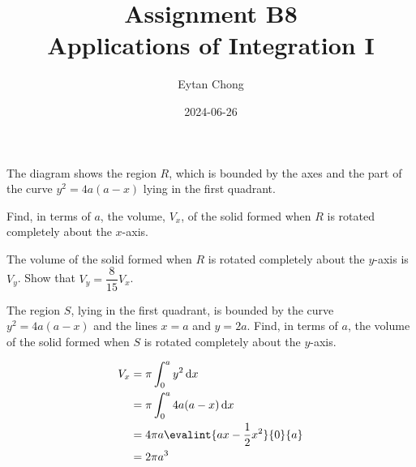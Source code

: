 \documentclass{echw}
\title{Assignment B8\\Applications of Integration I}
\author{Eytan Chong}
\date{2024-06-26}
\begin{document}
    \problem{}
        The diagram shows the region $R$, which is bounded by the axes and the part of the curve $y^2 = 4a(a-x)$ lying in the first quadrant.

        Find, in terms of $a$, the volume, $V_x$, of the solid formed when $R$ is rotated completely about the $x$-axis.

        The volume of the solid formed when $R$ is rotated completely about the $y$-axis is $V_y$. Show that $V_y = \dfrac8{15} V_x$.

        The region $S$, lying in the first quadrant, is bounded by the curve $y^2 = 4a(a-x)$ and the lines $x = a$ and $y = 2a$. Find, in terms of $a$, the volume of the solid formed when $S$ is rotated completely about the $y$-axis.

        \begin{center}
        \end{center}

    \solution
        \begin{align*}
            V_x &= \pi \int_0^a y^2 \d x\\
            &= \pi \int_0^a 4a(a-x) \d x\\
            &= 4\pi a \evalint{ax - \dfrac12 x^2}{0}{a}\\
            &= 2\pi a^3
        \end{align*}
        
\end{document}
